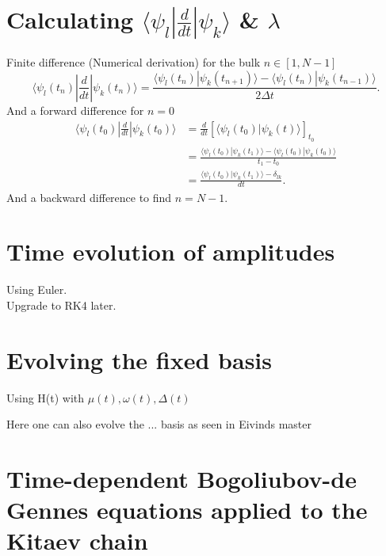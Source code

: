\section{Calculating $\langle \psi_l | \frac{d}{dt} | \psi_k \rangle $ \& $\lambda$}
Finite difference (Numerical derivation) for the bulk $n \in \left[1, N - 1\right]$
\begin{equation}
    \langle \psi_l(t_n)| \frac{d}{dt} |\psi_k(t_n) \rangle = \frac{\langle \psi_l(t_n) | \psi_k(t_{n+1})\rangle - \langle \psi_l(t_n) | \psi_k(t_{n-1})\rangle}{2 \Delta t}.
\end{equation}
And a forward difference for $n = 0$
\begin{align}
    \langle \psi_l(t_0)| \frac{d}{dt} |\psi_k(t_0) \rangle &= \frac{d}{dt}\left[ \langle \psi_l(t_0) | \psi_k(t)\rangle \right]_{t_0}\\
    &= \frac{\langle \psi_l(t_0) | \psi_k ( t_1) \rangle - \langle \psi_l(t_0) | \psi_k ( t_0 ) \rangle}{t_1 - t_0}\\
    &= \frac{\langle \psi_l(t_0) | \psi_k ( t_1) \rangle - \delta_{lk}}{dt}.
\end{align}
And a backward difference to find $n = N-1$.

\section{Time evolution of amplitudes}
Using Euler.\\
Upgrade to RK4 later.

\section{Evolving the fixed basis}
Using H(t) with $\mu(t), \omega(t), \Delta(t)$

Here one can also evolve the ... basis as seen in Eivinds master


\section{Time-dependent Bogoliubov-de Gennes equations applied to the Kitaev chain} \label{sec:Time_dependent_Kitaev_BdG}


